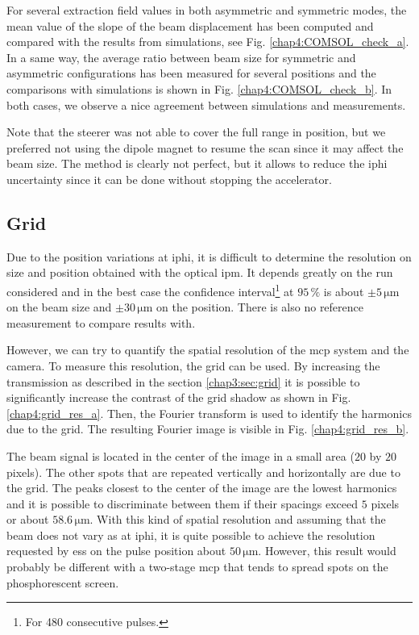 \begin{refsection}
  For several extraction field values in both asymmetric and symmetric modes, the mean value of the slope of the beam displacement has been computed and compared with the results from simulations, see Fig. \ref{chap4:COMSOL_check_a}. In a same way, the average ratio between beam size for symmetric and asymmetric configurations has been measured for several positions and the comparisons with simulations is shown in Fig. \ref{chap4:COMSOL_check_b}. In both cases, we observe a nice agreement between simulations and measurements.

  Note that the steerer was not able to cover the full range in position, but we preferred not using the dipole magnet to resume the scan since it may affect the beam size. The method is clearly not perfect, but it allows to reduce the \acrshort{iphi} uncertainty since it can be done without stopping the accelerator.
  

  \subsection{Grid}

  Due to the position variations at \acrshort{iphi}, it is difficult to determine the resolution on size and position obtained with the optical \acrshort{ipm}. It depends greatly on the run considered and in the best case the confidence interval\footnote{For 480 consecutive pulses.} at $95\,\mathrm{\%}$ is about $\pm 5\,\mathrm{\mu m}$ on the beam size and $\pm 30\,\mathrm{\mu m}$ on the position. There is also no reference measurement to compare results with.

  However, we can try to quantify the spatial resolution of the \acrshort{mcp} system and the camera.
  To measure this resolution, the grid can be used. By increasing the transmission as described in the section \ref{chap3:sec:grid} it is possible to significantly increase the contrast of the grid shadow as shown in Fig. \ref{chap4:grid_res_a}. Then, the Fourier transform is used to identify the harmonics due to the grid. The resulting Fourier image is visible in Fig. \ref{chap4:grid_res_b}. 
  

  The beam signal is located in the center of the image in a small area ($20$ by $20$ pixels). The other spots that are repeated vertically and horizontally are due to the grid. The peaks closest to the center of the image are the lowest harmonics and it is possible to discriminate between them if their spacings exceed $5$ pixels or about $58.6\,\mathrm{\mu m}$. With this kind of spatial resolution and assuming that the beam does not vary as at \acrshort{iphi}, it is quite possible to achieve the resolution requested by \acrshort{ess} on the pulse position about $50\,\mathrm{\mu m}$. However, this result would probably be different with a two-stage \acrshort{mcp} that tends to spread spots on the phosphorescent screen.



\end{refsection}
